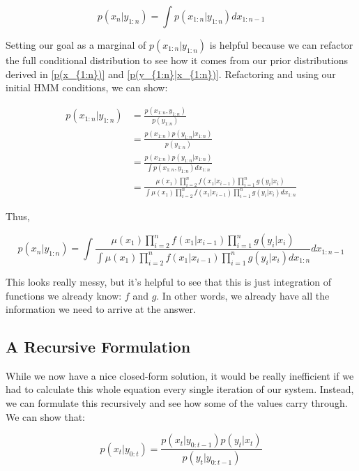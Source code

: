 \documentclass{article}
\begin{document}
\begin{equation}
p(x_{n}|y_{1:n}) = \int p(x_{1:n}|y_{1:n}) dx_{1:n-1}
\end{equation}

Setting our goal as a marginal of $p(x_{1:n}|y_{1:n})$ is helpful because we can refactor the full conditional distribution to see how it comes from our prior distributions derived in \eqref{p(x_{1:n})} and \eqref{p(y_{1:n}|x_{1:n})}. Refactoring and using our initial HMM conditions, we can show:

\begin{equation}
\begin{split}
p(x_{1:n}|y_{1:n}) &= \frac{p(x_{1:n},y_{1:n})}{p(y_{1:n})}\\
&= \frac{p(x_{1:n}) p(y_{1:n}|x_{1:n})}{p(y_{1:n})}\\
&= \frac{p(x_{1:n}) p(y_{1:n}|x_{1:n})}{\int p(x_{1:n},y_{1:n}) dx_{1:n}}\\
&= \frac{\mu(x_1)\prod_{i=2}^{n} f(x_1|x_{i-1})\prod_{i=1}^{n} g(y_i|x_i)}{\int \mu(x_1)\prod_{i=2}^{n} f(x_1|x_{i-1})\prod_{i=1}^{n} g(y_i|x_i) dx_{1:n}}
\end{split}
\end{equation}

Thus,

\begin{equation}
p(x_n|y_{1:n}) = \int \frac{\mu(x_1)\prod_{i=2}^{n} f(x_1|x_{i-1})\prod_{i=1}^{n} g(y_i|x_i)}{\int \mu(x_1)\prod_{i=2}^{n} f(x_1|x_{i-1})\prod_{i=1}^{n} g(y_i|x_i) dx_{1:n}} dx_{1:n-1}
\end{equation}

This looks really messy, but it's helpful to see that this is just integration of functions we already know: $f$ and $g$. In other words, we already have all the information we need to arrive at the answer.

\subsection{A Recursive Formulation}
While we now have a nice closed-form solution, it would be really inefficient if we had to calculate this whole equation every single iteration of our system. Instead, we can formulate this recursively and see how some of the values carry through. We can show that:

\begin{equation}
p(x_t|y_{0:t}) = \frac{p(x_t|y_{0:t-1})p(y_t|x_t)}{p(y_t|y_{0:t-1})}
\end{equation}
\end{document}
